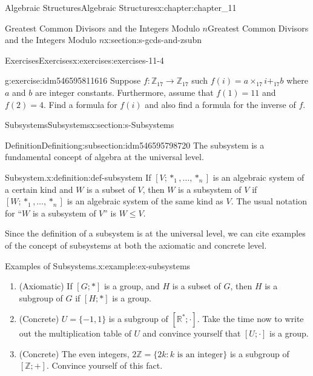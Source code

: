 \documentclass[oneside,10pt,]{book}
\numberwithin{equation}{section}
\begin{document}
\begin{chapterptx}{Algebraic Structures}{}{Algebraic Structures}{}{}{x:chapter:chapter_11}
\begin{sectionptx}{Greatest Common Divisors  and the Integers Modulo \(n\)}{}{Greatest Common Divisors  and the Integers Modulo \(n\)}{}{}{x:section:s-gcds-and-zsubn}
\begin{exercises-subsection}{Exercises}{}{Exercises}{}{}{x:exercises:exercises-11-4}
\begin{divisionexercise}{11}{}{}{g:exercise:idm546595811616}%
Suppose \(f:\mathbb{Z}_{17}\to \mathbb{Z}_{17}\) such \(f(i)=a \times_{17} i +_{17} b \) where \(a\) and \(b\) are integer constants. Furthermore,  assume that \(f(1)=11\) and \(f(2)=4\). Find a formula for \(f(i)\) and also find a formula for the inverse of \(f\).%
\end{divisionexercise}%
\end{exercises-subsection}
\end{sectionptx}
%
%
\typeout{************************************************}
\typeout{************************************************}
%
\begin{sectionptx}{Subsystems}{}{Subsystems}{}{}{x:section:s-Subsystems}
%
%
%
\typeout{************************************************}
\typeout{************************************************}
%
\begin{subsectionptx}{Definition}{}{Definition}{}{}{g:subsection:idm546595798720}
The subsystem is a fundamental concept of algebra at the universal level.%
\begin{definition}{Subsystem.}{x:definition:def-subsystem}%
%
\label{g:notation:idm546595797216}%
If \(\left[V; *_1, \ldots ,*_n\right]\) is an algebraic system of a certain kind and \(W\) is a subset of \(V\), then \(W\) is a subsystem of \(V\) if \(\left[W; *_1, \ldots ,*_n\right]\) is an algebraic system of the same kind as \(V\). The usual notation for ``\(W\) is a subsystem of \(V\)'' is \(W \leq V\).%
\end{definition}
Since the definition of a subsystem is at the universal level, we can cite examples of the concept of subsystems at both the axiomatic and concrete level.%
\begin{example}{Examples of Subsystems.}{x:example:ex-subsystems}%
%
\begin{enumerate}[label=(\alph*)]
\item{}(Axiomatic) If \([G; *]\) is a group, and \(H\) is a subset of \(G\), then \(H\) is a subgroup of \(G\) if \([H; *]\) is a group.%
\item{}(Concrete) \(U = \{-1,1\}\) is a subgroup of \(\left[\mathbb{R}^*;\cdot \right]\). Take the time now to write out the multiplication table of \(U\) and convince yourself that \([U;\cdot ]\) is a group.%
\item{}(Concrete) The even integers, \(2\mathbb{Z} = \{2k : k \textrm{ is} \textrm{ an} \textrm{ integer}\}\) is a subgroup of \([\mathbb{Z}; +]\). Convince yourself of this fact.%

\end{enumerate}
\end{example}
\end{subsectionptx}
\end{sectionptx}
\end{chapterptx}
\end{document}
